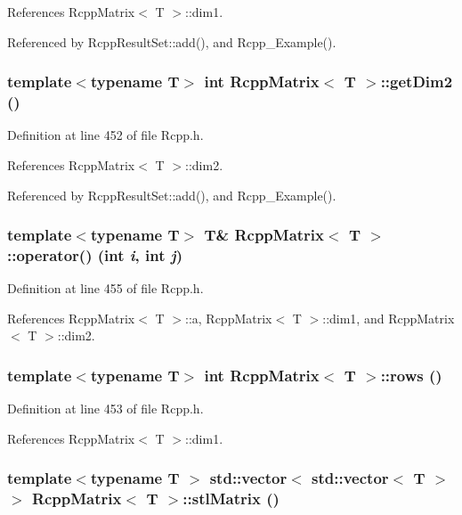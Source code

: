 References RcppMatrix$<$ T $>$::dim1.

Referenced by RcppResultSet::add(), and Rcpp\_\-Example().\hypertarget{classRcppMatrix_a356e04f844e3ebfac29b50e2e749734f}{
\subsubsection[{getDim2}]{\setlength{\rightskip}{0pt plus 5cm}template$<$typename T$>$ int {\bf RcppMatrix}$<$ T $>$::getDim2 ()}}
\label{classRcppMatrix_a356e04f844e3ebfac29b50e2e749734f}


Definition at line 452 of file Rcpp.h.

References RcppMatrix$<$ T $>$::dim2.

Referenced by RcppResultSet::add(), and Rcpp\_\-Example().\hypertarget{classRcppMatrix_a7733c87524d7e216f70fc10ccc971a29}{
\subsubsection[{operator()}]{\setlength{\rightskip}{0pt plus 5cm}template$<$typename T$>$ T\& {\bf RcppMatrix}$<$ T $>$::operator() (int {\em i}, \/  int {\em j})}}
\label{classRcppMatrix_a7733c87524d7e216f70fc10ccc971a29}


Definition at line 455 of file Rcpp.h.

References RcppMatrix$<$ T $>$::a, RcppMatrix$<$ T $>$::dim1, and RcppMatrix$<$ T $>$::dim2.\hypertarget{classRcppMatrix_a17749a8e567433b055be1221c399f0cd}{
\subsubsection[{rows}]{\setlength{\rightskip}{0pt plus 5cm}template$<$typename T$>$ int {\bf RcppMatrix}$<$ T $>$::rows ()}}
\label{classRcppMatrix_a17749a8e567433b055be1221c399f0cd}


Definition at line 453 of file Rcpp.h.

References RcppMatrix$<$ T $>$::dim1.\hypertarget{classRcppMatrix_ae74547edb5d989adb87b2e483153de89}{
\subsubsection[{stlMatrix}]{\setlength{\rightskip}{0pt plus 5cm}template$<$typename T $>$ std::vector$<$ std::vector$<$ T $>$ $>$ {\bf RcppMatrix}$<$ T $>$::stlMatrix ()}}
\label{classRcppMatrix_ae74547edb5d989adb87b2e483153de89}


